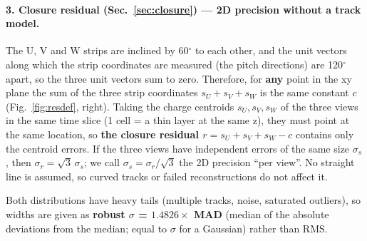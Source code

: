 \documentclass[a4paper,11pt]{article}
\begin{document}
\paragraph{3. Closure residual (Sec.~\ref{sec:closure}) --- 2D precision without a track model.}
The U, V and W strips are inclined by 60$^\circ$ to each other, and the unit vectors along which the strip coordinates are measured (the pitch directions) are 120$^\circ$ apart, so the three unit vectors sum to zero.
Therefore, for \textbf{any} point in the xy plane the sum of the three strip coordinates $s_U + s_V + s_W$ is the same constant $c$ (Fig.~\ref{fig:resdef}, right).
Taking the charge centroids $s_U, s_V, s_W$ of the three views in the same time slice (1 cell = a thin layer at the same z),
they must point at the same location, so \textbf{the closure residual $r = s_U + s_V + s_W - c$} contains only the centroid errors.
If the three views have independent errors of the same size $\sigma_s$, then $\sigma_r = \sqrt{3}\,\sigma_s$; we call $\sigma_s = \sigma_r / \sqrt{3}$
the 2D precision ``per view''. No straight line is assumed, so curved tracks or failed reconstructions do not affect it.

Both distributions have heavy tails (multiple tracks, noise, saturated outliers), so widths are given as
\textbf{robust $\sigma$ = $1.4826 \times$ MAD} (median of the absolute deviations from the median; equal to $\sigma$ for a Gaussian) rather than RMS.
\end{document}
